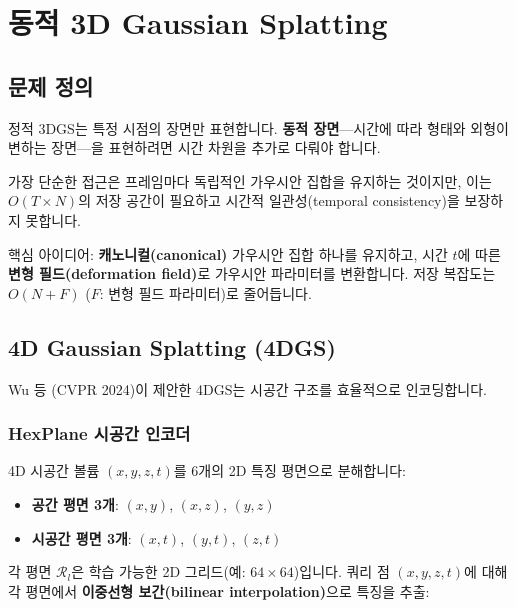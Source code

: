 \documentclass[11pt, a4paper]{report}
\begin{document}
\chapter{동적 3D Gaussian Splatting}
\label{ch:dynamic}

\section{문제 정의}

정적 3DGS는 특정 시점의 장면만 표현합니다. \textbf{동적 장면}---시간에 따라 형태와 외형이 변하는 장면---을 표현하려면 시간 차원을 추가로 다뤄야 합니다.

가장 단순한 접근은 프레임마다 독립적인 가우시안 집합을 유지하는 것이지만, 이는 $O(T \times N)$의 저장 공간이 필요하고 시간적 일관성(temporal consistency)을 보장하지 못합니다.

\begin{keyidea}
핵심 아이디어: \textbf{캐노니컬(canonical)} 가우시안 집합 하나를 유지하고, 시간 $t$에 따른 \textbf{변형 필드(deformation field)}로 가우시안 파라미터를 변환합니다. 저장 복잡도는 $O(N + F)$ ($F$: 변형 필드 파라미터)로 줄어듭니다.
\end{keyidea}

\section{4D Gaussian Splatting (4DGS)}
\label{sec:4dgs}

Wu 등 (CVPR 2024)이 제안한 4DGS는 시공간 구조를 효율적으로 인코딩합니다.

\subsection{HexPlane 시공간 인코더}

4D 시공간 볼륨 $(x, y, z, t)$를 6개의 2D 특징 평면으로 분해합니다:

\begin{itemize}[leftmargin=*]
  \item \textbf{공간 평면 3개}: $(x,y)$, $(x,z)$, $(y,z)$
  \item \textbf{시공간 평면 3개}: $(x,t)$, $(y,t)$, $(z,t)$
\end{itemize}

각 평면 $\mathcal{R}_l$은 학습 가능한 2D 그리드(예: $64 \times 64$)입니다. 쿼리 점 $(x,y,z,t)$에 대해 각 평면에서 \textbf{이중선형 보간(bilinear interpolation)}으로 특징을 추출:
\end{document}

